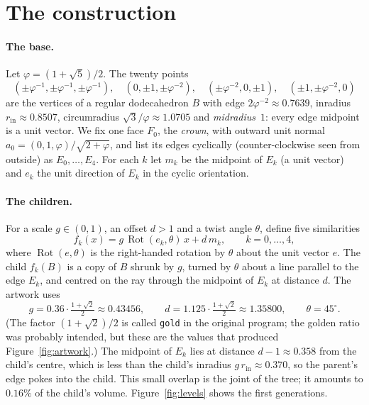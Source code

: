 \documentclass[11pt,a4paper]{article}
\theoremstyle{definition}
\theoremstyle{remark}
\newcommand{\Rot}{\operatorname{Rot}}
\begin{document}
\section{The construction}\label{sec:construction}

\paragraph{The base.}  Let $\varphi=(1+\sqrt5)/2$.  The twenty points
\[
  (\pm\varphi^{-1},\pm\varphi^{-1},\pm\varphi^{-1}),\quad
  (0,\pm1,\pm\varphi^{-2}),\quad(\pm\varphi^{-2},0,\pm1),\quad(\pm1,\pm\varphi^{-2},0)
\]
are the vertices of a regular dodecahedron $B$ with edge $2\varphi^{-2}\approx
0.7639$, inradius $r_{\mathrm{in}}\approx0.8507$, circumradius
$\sqrt3/\varphi\approx1.0705$ and \emph{midradius}~$1$: every edge midpoint is
a unit vector.  We fix one face $F_0$, the \emph{crown}, with outward unit
normal $a_0=(0,1,\varphi)/\sqrt{2+\varphi}$, and list its edges cyclically
(counter-clockwise seen from outside) as $E_0,\dots,E_4$.  For each $k$ let
$m_k$ be the midpoint of $E_k$ (a unit vector) and $e_k$ the unit direction of
$E_k$ in the cyclic orientation.

\paragraph{The children.}  For a scale $g\in(0,1)$, an offset $d>1$ and a twist
angle $\theta$, define five similarities
\begin{equation}\label{eq:maps}
  f_k(x) = g\,\Rot(e_k,\theta)\,x + d\,m_k,\qquad k=0,\dots,4,
\end{equation}
where $\Rot(e,\theta)$ is the right-handed rotation by $\theta$ about the unit
vector $e$.  The child $f_k(B)$ is a copy of $B$ shrunk by $g$, turned by
$\theta$ about a line parallel to the edge $E_k$, and centred on the ray
through the midpoint of $E_k$ at distance $d$.  The artwork uses
\begin{equation}\label{eq:params}
  g = 0.36\cdot\tfrac{1+\sqrt2}{2}\approx 0.43456,\qquad
  d = 1.125\cdot\tfrac{1+\sqrt2}{2}\approx 1.35800,\qquad
  \theta = 45^\circ .
\end{equation}
(The factor $(1+\sqrt2)/2$ is called \texttt{gold} in the original program; the
golden ratio was probably intended, but these are the values that produced
Figure~\ref{fig:artwork}.)  The midpoint of $E_k$ lies at distance
$d-1\approx0.358$ from the child's centre, which is less than the child's
inradius $g\,r_{\mathrm{in}}\approx0.370$, so the parent's edge pokes into the
child.  This small overlap is the joint of the tree; it amounts to $0.16\%$ of
the child's volume.  Figure~\ref{fig:levels} shows the first generations.
\end{document}

